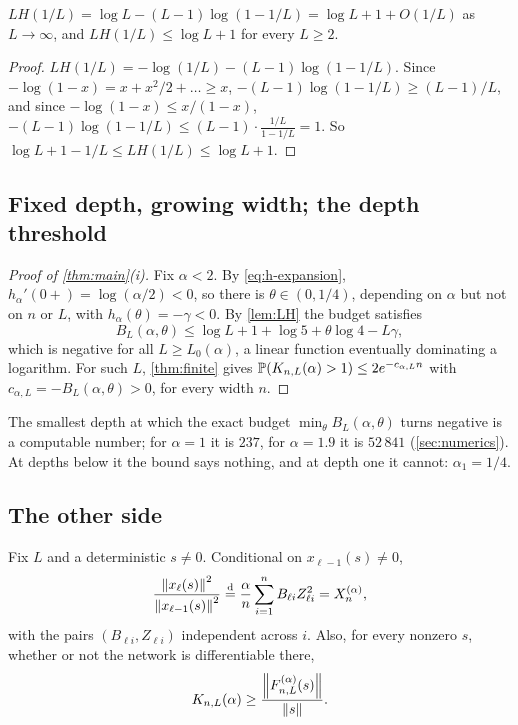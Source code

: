 \begin{lemma}\label{lem:LH}
$LH(1/L)=\log L-(L-1)\log(1-1/L)=\log L+1+O(1/L)$ as $L\to\infty$, and $LH(1/L)\le\log L+1$ for every $L\ge2$.
\end{lemma}

\begin{proof}
$LH(1/L)=-\log(1/L)-(L-1)\log(1-1/L)$. Since $-\log(1-x)=x+x^2/2+\dots\ge x$, $-(L-1)\log(1-1/L)\ge(L-1)/L$, and since $-\log(1-x)\le x/(1-x)$, $-(L-1)\log(1-1/L)\le(L-1)\cdot\frac{1/L}{1-1/L}=1$. So $\log L+1-1/L\le LH(1/L)\le\log L+1$.
\end{proof}

\subsection{Fixed depth, growing width; the depth threshold}

\begin{proof}[Proof of \cref{thm:main}(i)]
Fix $\alpha<2$. By \cref{eq:h-expansion}, $h_\alpha'(0+)=\log(\alpha/2)<0$, so there is $\theta\in(0,1/4)$, depending on $\alpha$ but not on $n$ or $L$, with $h_\alpha(\theta)=-\gamma<0$. By \cref{lem:LH} the budget satisfies
\[
B_L(\alpha,\theta)\le\log L+1+\log5+\theta\log4-L\gamma,
\]
which is negative for all $L\ge L_0(\alpha)$, a linear function eventually dominating a logarithm. For such $L$, \cref{thm:finite} gives $\mathbb{P}(K_{n,L}(\alpha)>1)\le2e^{-c_{\alpha,L}n}$ with $c_{\alpha,L}=-B_L(\alpha,\theta)>0$, for every width $n$.
\end{proof}

The smallest depth at which the exact budget $\min_\theta B_L(\alpha,\theta)$ turns negative is a computable number; for $\alpha=1$ it is $237$, for $\alpha=1.9$ it is $52\,841$ (\cref{sec:numerics}). At depths below it the bound says nothing, and at depth one it cannot: $\alpha_1=1/4$.

\subsection{The other side}

\begin{lemma}\label{lem:forward}
Fix $L$ and a deterministic $s\ne0$. Conditional on $x_{\ell-1}(s)\ne0$,
\begin{equation}\label{eq:ratio}
\frac{\left\lVert x_\ell(s)\right\rVert^2}{\left\lVert x_{\ell-1}(s)\right\rVert^2}\overset{\mathrm{d}}{=}\frac\alpha n\sum_{i=1}^nB_{\ell i}Z_{\ell i}^2=X_n^{(\alpha)},
\end{equation}
with the pairs $(B_{\ell i},Z_{\ell i})$ independent across $i$. Also, for every nonzero $s$, whether or not the network is differentiable there,
\begin{equation}\label{eq:K-lower}
K_{n,L}(\alpha)\ge\frac{\left\lVert F^{(\alpha)}_{n,L}(s)\right\rVert}{\left\lVert s\right\rVert}.
\end{equation}
\end{lemma}

